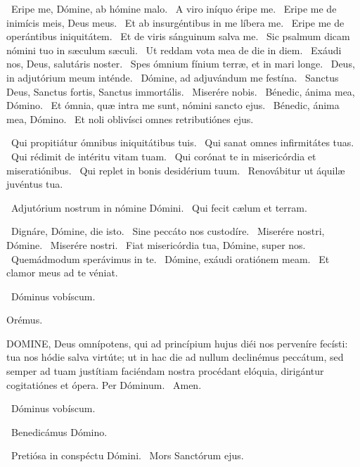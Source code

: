 
\V\ Eripe me, Dómine, ab hómine malo. \R\ A viro iníquo éripe me. \V\ Eripe me de inimícis meis, Deus meus. \R\ Et ab insurgéntibus in me líbera me. \V\ Eripe me de operántibus iniquitátem. \R\ Et de viris sánguinum salva me. \V\ Sic psalmum dicam nómini tuo in sæculum sæculi. \R\ Ut reddam vota mea de die in diem. \V\ Exáudi nos, Deus, salutáris noster. \R\ Spes ómnium fínium terræ, et in mari longe. \V\ Deus, in adjutórium meum inténde. \R\ Dómine, ad adjuvándum me festína. \V\ Sanctus Deus, Sanctus fortis, Sanctus immortális. \R\ Miserére nobis. \V\ Bénedic, ánima mea, Dómino. \R\ Et ómnia, quæ intra me sunt, nómini sancto ejus. \V\ Bénedic, ánima mea, Dómino. \R\ Et noli oblivísci omnes retributiónes ejus.

\V\ Qui propitiátur ómnibus iniquitátibus tuis. \R\ Qui sanat omnes infirmitátes tuas. \V\ Qui rédimit de intéritu vitam tuam. \R\ Qui corónat te in misericórdia et miseratiónibus. \V\ Qui replet in bonis desidérium tuum. \R\ Renovábitur ut áquilæ juvéntus tua.


\V\ Adjutórium nostrum in nómine Dómini. \R\ Qui fecit cælum et terram.


\V\ Dignáre, Dómine, die isto. \R\ Sine peccáto nos custodíre. \V\ Miserére nostri, Dómine. \R\ Miserére nostri. \V\ Fiat misericórdia tua, Dómine, super nos. \R\ Quemádmodum sperávimus in te. \V\ Dómine, exáudi oratiónem meam. \R\ Et clamor meus ad te véniat.

\sectionornament

\V\ Dóminus vobíscum.

Orémus. 

\lettrine[lines=2]{D}{OMINE}, Deus omnípotens, qui ad princípium hujus diéi nos perveníre fecísti: tua nos hódie salva virtúte; ut in hac die ad nullum declinémus peccátum, sed semper ad tuam justítiam faciéndam nostra procédant elóquia, dirigántur cogitatiónes et ópera. Per Dóminum. \R\ Amen.

\V\ Dóminus vobíscum.

\V\ Benedicámus Dómino.


\V\ Pretiósa in conspéctu Dómini. \R\ Mors Sanctórum ejus.


